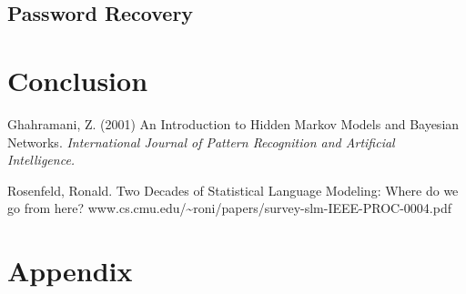 \documentclass{amsart}
\theoremstyle{definition}
\theoremstyle{remark}
\numberwithin{equation}{section}
\begin{document}
\subsection{Password Recovery}

\section{Conclusion}

\newpage

\begin{thebibliography}{9}
Ghahramani, Z. (2001) An Introduction to Hidden Markov Models and Bayesian Networks.
\textit{International Journal of Pattern Recognition and Artificial Intelligence.}

Rosenfeld, Ronald. Two Decades of Statistical Language Modeling: Where do we go from here?
www.cs.cmu.edu/\textasciitilde{}roni/papers/survey-slm-IEEE-PROC-0004.pdf

\end{thebibliography}

\newpage

\section{Appendix}
\end{document}
